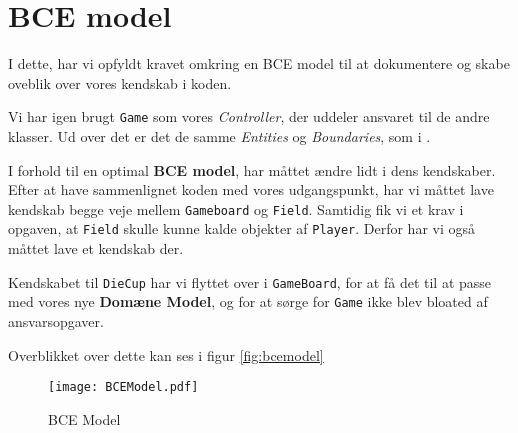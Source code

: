 \section{BCE model}
I dette, har vi opfyldt kravet omkring en BCE model til at dokumentere og skabe oveblik over vores kendskab i koden.


Vi har igen brugt \texttt{Game} som vores \textit{Controller}, der uddeler ansvaret til de andre klasser. Ud over det er det de samme \textit{Entities} og \textit{Boundaries}, som i \cite{19del2}.

I forhold til en optimal \textbf{BCE model}, har måttet ændre lidt i dens kendskaber. Efter at have sammenlignet koden med vores udgangspunkt, har vi måttet lave kendskab begge veje mellem \texttt{Gameboard} og \texttt{Field}. Samtidig fik vi et krav i opgaven, at \texttt{Field} skulle kunne kalde objekter af \texttt{Player}. Derfor har vi også måttet lave et kendskab der.

Kendskabet til \texttt{DieCup} har vi flyttet over i \texttt{GameBoard}, for at få det til at passe med vores nye \textbf{Domæne Model}, og for at sørge for \texttt{Game} ikke blev bloated af ansvarsopgaver.

Overblikket over dette kan ses i figur \vref{fig:bcemodel}

\begin{figure}[ht]
\centering
\texttt{[image: BCEModel.pdf]}
\caption[<Text for the list of figures>]{BCE Model}
\label{fig:bcemodel}
\end{figure}
\newpage